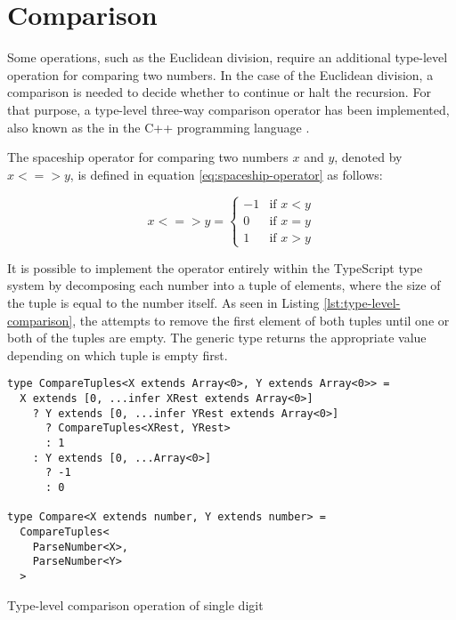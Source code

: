 \clearpage 

\section{Comparison}

Some operations, such as the Euclidean division, require an additional type-level operation for comparing two numbers. In the case of the Euclidean division, a comparison is needed to decide whether to continue or halt the recursion. For that purpose, a type-level three-way comparison operator has been implemented, also known as the  in the C++ programming language \cite{sutterConsistentComparison2017}.

The spaceship operator for comparing two numbers $x$ and $y$, denoted by $x <=> y$, is defined in equation \ref{eq:spaceship-operator} as follows:

\begin{equation}\label{eq:spaceship-operator}
  x <=> y =
  \begin{cases}
    -1 & \text{if } x < y \\
    0  & \text{if } x = y \\
    1  & \text{if } x > y
  \end{cases}
\end{equation}

It is possible to implement the operator entirely within the TypeScript type system by decomposing each number into a tuple of elements, where the size of the tuple is equal to the number itself. As seen in Listing \ref{lst:type-level-comparison}, the  attempts to remove the first element of both tuples until one or both of the tuples are empty. The generic type returns the appropriate value depending on which tuple is empty first.

\begin{listing}[ht]
  \begin{verbatim}
type CompareTuples<X extends Array<0>, Y extends Array<0>> =
  X extends [0, ...infer XRest extends Array<0>]
    ? Y extends [0, ...infer YRest extends Array<0>]
      ? CompareTuples<XRest, YRest>
      : 1
    : Y extends [0, ...Array<0>]
      ? -1
      : 0

type Compare<X extends number, Y extends number> =
  CompareTuples<
    ParseNumber<X>, 
    ParseNumber<Y>
  >
\end{verbatim}
  \caption{Type-level comparison operation of single digit}\label{lst:type-level-comparison}
\end{listing}

